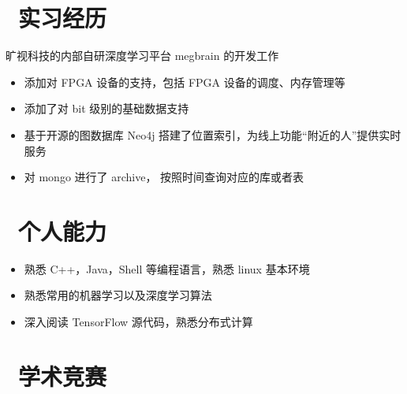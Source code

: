 \documentclass{resume}
\begin{document}
\section{\faUsers\ 实习经历}
旷视科技的内部自研深度学习平台 megbrain 的开发工作
\begin{itemize}
  \item 添加对 FPGA 设备的支持，包括 FPGA 设备的调度、内存管理等
  \item 添加了对 bit 级别的基础数据支持
\end{itemize}

\begin{itemize}
  \item 基于开源的图数据库 Neo4j 搭建了位置索引，为线上功能“附近的人”提供实时服务
  \item 对 mongo 进行了 archive， 按照时间查询对应的库或者表
\end{itemize}


\section{\faCogs\ 个人能力}
\begin{itemize}[parsep=0.5ex]
  \item 熟悉 C++，Java，Shell 等编程语言，熟悉 linux 基本环境
  \item 熟悉常用的机器学习以及深度学习算法
  \item 深入阅读 TensorFlow 源代码，熟悉分布式计算
\end{itemize}

\section{\faTrophy\ 学术竞赛}
%
%
\end{document}
